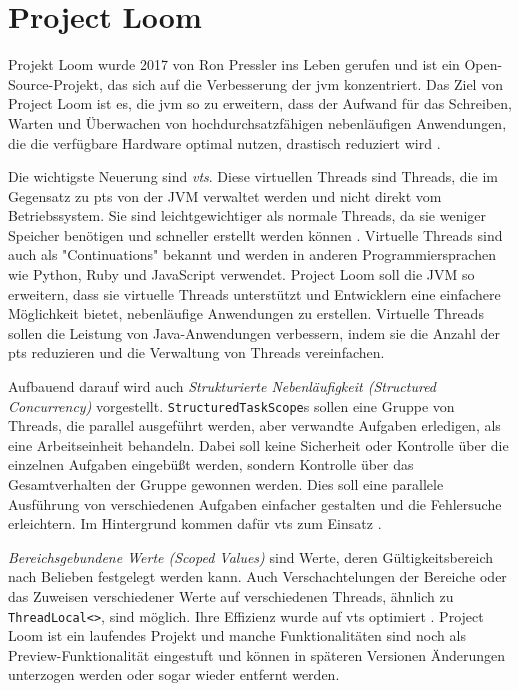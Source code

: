 \chapter{Project Loom}
\label{cha:ProjectLoom}

    Projekt Loom wurde 2017 von Ron Pressler ins Leben gerufen und ist ein Open-Source-Projekt, 
    das sich auf die Verbesserung der \gls{jvm} konzentriert. Das Ziel von Project Loom ist es, 
    die \gls{jvm} so zu erweitern, dass der Aufwand für das Schreiben, Warten und Überwachen von hochdurchsatzfähigen nebenläufigen Anwendungen,
    die die verfügbare Hardware optimal nutzen, drastisch reduziert wird \cite{ProjectLoom}.

    Die wichtigste Neuerung sind \emph{\Glspl{vt}}.
    Diese virtuellen Threads sind Threads, die im Gegensatz zu \Glspl{pt} von der JVM verwaltet werden und nicht direkt vom Betriebssystem. 
    Sie sind leichtgewichtiger als normale Threads, da sie weniger Speicher benötigen und schneller erstellt werden können \cite{JEP444}.
    Virtuelle Threads sind auch als "Continuations" bekannt und werden in anderen Programmiersprachen wie Python, Ruby und JavaScript verwendet.
    Project Loom soll die JVM so erweitern, dass sie virtuelle Threads unterstützt und Entwicklern eine einfachere Möglichkeit bietet,
    nebenläufige Anwendungen zu erstellen. Virtuelle Threads sollen die Leistung von Java-Anwendungen verbessern, indem sie die Anzahl der \Glspl{pt} reduzieren und 
    die Verwaltung von Threads vereinfachen. 

    Aufbauend darauf wird auch \emph{Strukturierte Nebenläufigkeit (Structured Concurrency)} vorgestellt.
    \texttt{StructuredTaskScope}s sollen eine Gruppe von Threads, die parallel ausgeführt werden, aber verwandte Aufgaben erledigen, als eine Arbeitseinheit behandeln. 
    Dabei soll keine Sicherheit oder Kontrolle über die einzelnen Aufgaben eingebüßt werden, sondern Kontrolle über das Gesamtverhalten der Gruppe gewonnen werden.
    Dies soll eine parallele Ausführung von verschiedenen Aufgaben einfacher gestalten und die Fehlersuche erleichtern.
    Im Hintergrund kommen dafür \Glspl{vt} zum Einsatz \cite{JEP453}.

    \emph{Bereichsgebundene Werte (Scoped Values)} sind Werte, deren Gültigkeitsbereich nach Belieben festgelegt werden kann.
    Auch Verschachtelungen der Bereiche oder das
    Zuweisen verschiedener Werte auf verschiedenen Threads, ähnlich zu \texttt{ThreadLocal<>}, sind möglich. Ihre Effizienz wurde auf \Glspl{vt} optimiert
    \cite{JEP481}.
    Project Loom ist ein laufendes Projekt und manche Funktionalitäten sind noch als Preview-Funktionalität eingestuft und können in späteren Versionen Änderungen 
    unterzogen werden oder sogar wieder entfernt werden.



